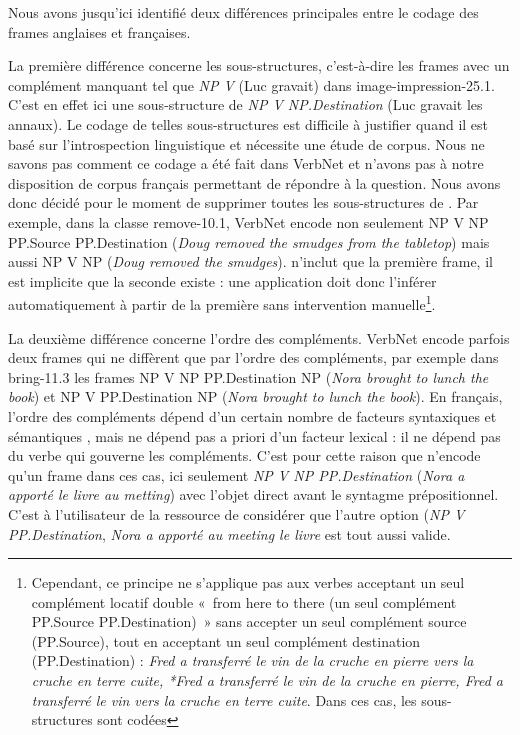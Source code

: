 Nous avons jusqu'ici identifié deux différences principales entre le codage des
frames anglaises et françaises.

La première différence concerne les sous-structures, c'est-à-dire les frames
avec un complément manquant tel que \emph{NP V} (Luc gravait) dans
{\color{blue}image-impression-25.1}. C'est en effet ici une sous-structure de
\emph{NP V NP.Destination} (Luc gravait les annaux). Le codage de telles
sous-structures est difficile à justifier quand il est basé sur l'introspection
linguistique et nécessite une étude de corpus. Nous ne savons pas comment ce
codage a été fait dans VerbNet et n'avons pas à notre disposition de corpus
français permettant de répondre à la question. Nous avons donc décidé pour le
moment de supprimer toutes les sous-structures de \verbenet{}. Par exemple,
dans la classe {\color{blue}remove-10.1}, VerbNet encode non seulement NP V NP
PP.Source PP.Destination (\emph{Doug removed the smudges from the tabletop})
mais aussi NP V NP (\emph{Doug removed the smudges}). \verbenet{} n'inclut que
la première frame, il est implicite que la seconde existe : une application
doit donc l'inférer automatiquement à partir de la première sans intervention
manuelle\footnote{Cependant, ce principe ne s'applique pas aux verbes acceptant
un seul complément locatif double «~from here to there (un seul
complément PP.Source PP.Destination)~» sans accepter un seul complément source
(PP.Source), tout en acceptant un seul complément destination
(PP.Destination) : \emph{Fred a transferré le vin de la cruche en pierre vers
la cruche en terre cuite, *Fred a transferré le vin de la cruche en pierre,
Fred a transferré le vin vers la cruche en terre cuite}. Dans ces cas, les
sous-structures sont codées}.

La deuxième différence concerne l'ordre des compléments. VerbNet encode parfois
deux frames qui ne diffèrent que par l'ordre des compléments, par exemple dans
{\color{blue}bring-11.3} les frames NP V NP PP.Destination NP (\emph{Nora
brought to lunch the book}) et NP V PP.Destination NP (\emph{Nora brought to
lunch the book}). En français, l'ordre des compléments dépend d'un certain
nombre de facteurs syntaxiques et sémantiques \citep{thuilier2012contraintes},
mais ne dépend pas a priori d'un facteur lexical : il ne dépend pas du verbe
qui gouverne les compléments. C'est pour cette raison que \verbenet{} n'encode
qu'un frame dans ces cas, ici seulement \emph{NP V NP PP.Destination}
(\emph{Nora a apporté le livre au metting}) avec l'objet direct avant le
syntagme prépositionnel. C'est à l'utilisateur de la ressource de considérer
que l'autre option (\emph{NP V PP.Destination}, \emph{Nora a apporté au meeting
le livre} est tout aussi valide.


